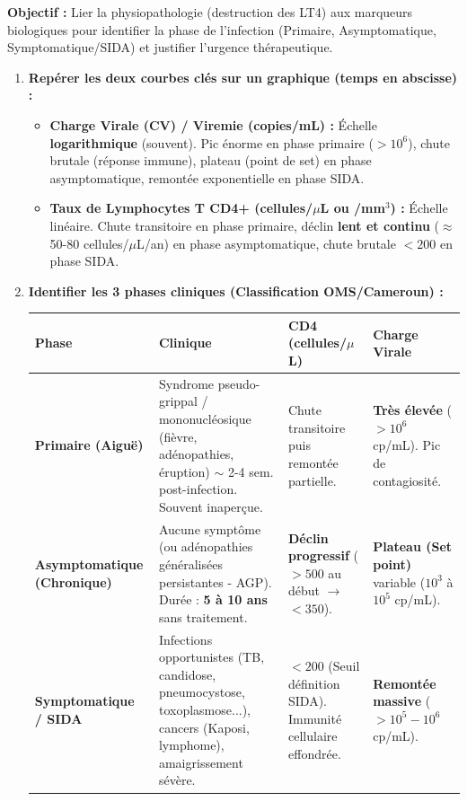 \documentclass[11pt]{article}
\begin{document}
\begin{methode}
\textbf{Objectif :} Lier la physiopathologie (destruction des LT4) aux marqueurs biologiques pour identifier la phase de l'infection (Primaire, Asymptomatique, Symptomatique/SIDA) et justifier l'urgence thérapeutique.
\begin{enumerate}
    \item \textbf{Repérer les deux courbes clés sur un graphique (temps en abscisse) :}
    \begin{itemize}
        \item \textbf{Charge Virale (CV) / Viremie (copies/mL) :} Échelle \textbf{logarithmique} (souvent). Pic énorme en phase primaire ($>10^6$), chute brutale (réponse immune), plateau (point de set) en phase asymptomatique, remontée exponentielle en phase SIDA.
        \item \textbf{Taux de Lymphocytes T CD4+ (cellules/$\mu$L ou /mm$^3$) :} Échelle linéaire. Chute transitoire en phase primaire, déclin \textbf{lent et continu} ($\approx$ 50-80 cellules/$\mu$L/an) en phase asymptomatique, chute brutale $< 200$ en phase SIDA.
    \end{itemize}
    \item \textbf{Identifier les 3 phases cliniques (Classification OMS/Cameroun) :}
    \begin{center}
    \begin{tabularx}{\linewidth}{|l|X|X|X|}\hline
    \rowcolor{popblueL} \textbf{Phase} & \textbf{Clinique} & \textbf{CD4 (cellules/$\mu$L)} & \textbf{Charge Virale} \\ \hline
    \textbf{Primaire (Aiguë)} & Syndrome pseudo-grippal / mononucléosique (fièvre, adénopathies, éruption) $\sim$ 2-4 sem. post-infection. Souvent inaperçue. & Chute transitoire puis remontée partielle. & \textbf{Très élevée} ($> 10^6$ cp/mL). Pic de contagiosité. \\ \hline
    \textbf{Asymptomatique (Chronique)} & Aucune symptôme (ou adénopathies généralisées persistantes - AGP). Durée : \textbf{5 à 10 ans} sans traitement. & \textbf{Déclin progressif} ($> 500$ au début $\rightarrow$ $< 350$). & \textbf{Plateau (Set point)} variable ($10^3$ à $10^5$ cp/mL). \\ \hline
    \textbf{Symptomatique / SIDA} & Infections opportunistes (TB, candidose, pneumocystose, toxoplasmose...), cancers (Kaposi, lymphome), amaigrissement sévère. & \textbf{$< 200$} (Seuil définition SIDA). Immunité cellulaire effondrée. & \textbf{Remontée massive} ($> 10^5 - 10^6$ cp/mL). \\ \hline

\end{tabularx}
\end{center}
\end{enumerate}
\end{methode}
\end{document}
